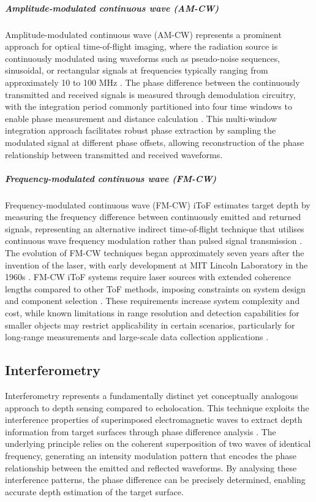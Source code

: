\documentclass[12pt,a4paper,oneside]{report}
\begin{document}
\subparagraph{Amplitude-modulated continuous wave (AM-CW)}
Amplitude-modulated continuous wave (AM-CW) represents a prominent approach for optical time-of-flight imaging, where the radiation source is continuously modulated using waveforms such as pseudo-noise sequences, sinusoidal, or rectangular signals at frequencies typically ranging from approximately 10 to 100 MHz \cite{bamji2022}. The phase difference between the continuously transmitted and received signals is measured through demodulation circuitry, with the integration period commonly partitioned into four time windows to enable phase measurement and distance calculation \cite{bamji2022}. This multi-window integration approach facilitates robust phase extraction by sampling the modulated signal at different phase offsets, allowing reconstruction of the phase relationship between transmitted and received waveforms.

\subparagraph{Frequency-modulated continuous wave (FM-CW)}
Frequency-modulated continuous wave (FM-CW) iToF estimates target depth by measuring the frequency difference between continuously emitted and returned signals, representing an alternative indirect time-of-flight technique that utilises continuous wave frequency modulation rather than pulsed signal transmission \cite{bamji2022}. The evolution of FM-CW techniques began approximately seven years after the invention of the laser, with early development at MIT Lincoln Laboratory in the 1960s \cite{gschwendtner2000,patel1968}. FM-CW iToF systems require laser sources with extended coherence lengths compared to other ToF methods, imposing constraints on system design and component selection \cite{bamji2022}. These requirements increase system complexity and cost, while known limitations in range resolution and detection capabilities for smaller objects may restrict applicability in certain scenarios, particularly for long-range measurements and large-scale data collection applications \cite{bamji2022}.

\subsection{Interferometry}
\label{subsec:interferometry}

Interferometry represents a fundamentally distinct yet conceptually analogous approach to depth sensing compared to echolocation. This technique exploits the interference properties of superimposed electromagnetic waves to extract depth information from target surfaces through phase difference analysis \cite{huang1991,aumann2019}. The underlying principle relies on the coherent superposition of two waves of identical frequency, generating an intensity modulation pattern that encodes the phase relationship between the emitted and reflected waveforms. By analysing these interference patterns, the phase difference can be precisely determined, enabling accurate depth estimation of the target surface.
\end{document}
